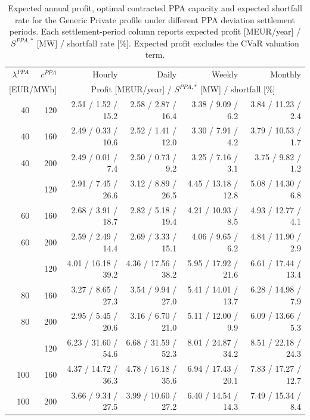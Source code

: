 \begin{table}[htbp]
\centering
\scriptsize
\setlength{\tabcolsep}{2.5pt}
\caption{Expected annual profit, optimal contracted PPA capacity and expected shortfall rate for the Generic Private profile under different PPA deviation settlement periods. Each settlement-period column reports expected profit [MEUR/year] / $S^{PPA,*}$ [MW] / shortfall rate [\%]. Expected profit excludes the CVaR valuation term.}
\label{tab:settlement_period_generic_private}
\begin{tabular*}{\textwidth}{@{\extracolsep{\fill}}rrrrrr@{}}
\toprule
$\lambda^{PPA}$ & $c^{PPA}$ & Hourly & Daily & Weekly & Monthly \\
\multicolumn{2}{c}{[EUR/MWh]} & \multicolumn{4}{c}{Profit [MEUR/year] / $S^{PPA,*}$ [MW] / shortfall [\%]} \\
\midrule
40 & 120 & 2.51 / 1.52 / 15.2 & 2.58 / 2.87 / 16.4 & 3.38 / 9.09 / 6.2 & 3.84 / 11.23 / 2.4 \\
40 & 160 & 2.49 / 0.33 / 10.6 & 2.52 / 1.41 / 12.0 & 3.30 / 7.91 / 4.2 & 3.79 / 10.53 / 1.7 \\
40 & 200 & 2.49 / 0.01 / 7.4 & 2.50 / 0.73 / 9.2 & 3.25 / 7.16 / 3.1 & 3.75 / 9.82 / 1.2 \\
\addlinespace
60 & 120 & 2.91 / 7.45 / 26.6 & 3.12 / 8.89 / 26.5 & 4.45 / 13.18 / 12.8 & 5.08 / 14.30 / 6.8 \\
60 & 160 & 2.68 / 3.91 / 18.7 & 2.82 / 5.18 / 19.4 & 4.21 / 10.93 / 8.5 & 4.93 / 12.77 / 4.1 \\
60 & 200 & 2.59 / 2.49 / 14.4 & 2.69 / 3.33 / 15.1 & 4.06 / 9.65 / 6.2 & 4.84 / 11.90 / 2.9 \\
\addlinespace
80 & 120 & 4.01 / 16.18 / 39.2 & 4.36 / 17.56 / 38.2 & 5.95 / 17.92 / 21.6 & 6.61 / 17.44 / 13.4 \\
80 & 160 & 3.27 / 8.65 / 27.3 & 3.54 / 9.94 / 27.0 & 5.41 / 14.01 / 13.7 & 6.28 / 14.98 / 7.9 \\
80 & 200 & 2.95 / 5.45 / 20.6 & 3.16 / 6.70 / 21.0 & 5.11 / 12.00 / 9.9 & 6.09 / 13.66 / 5.3 \\
\addlinespace
100 & 120 & 6.23 / 31.60 / 54.6 & 6.68 / 31.59 / 52.3 & 8.01 / 24.87 / 34.2 & 8.51 / 22.18 / 24.3 \\
100 & 160 & 4.37 / 14.72 / 36.3 & 4.78 / 16.18 / 35.6 & 6.94 / 17.43 / 20.1 & 7.83 / 17.27 / 12.7 \\
100 & 200 & 3.66 / 9.34 / 27.5 & 3.99 / 10.60 / 27.2 & 6.40 / 14.54 / 14.3 & 7.49 / 15.34 / 8.4 \\
\bottomrule
\end{tabular*}
\end{table}

